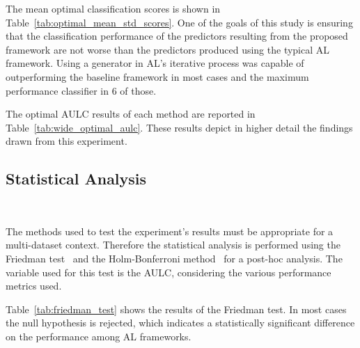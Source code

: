 \documentclass[parskip=full]{scrartcl}
\begin{document}
The mean optimal classification scores is shown in
Table~\ref{tab:optimal_mean_std_scores}. One of the goals of this study is
ensuring that the classification performance of the predictors resulting from
the proposed framework are not worse than the predictors produced using the
typical AL framework. Using a generator in AL's iterative process
was capable of outperforming the baseline framework in most cases and the
maximum performance classifier in 6 of those.


The optimal AULC results of each method are reported in
Table~\ref{tab:wide_optimal_aulc}. These results depict in higher detail the
findings drawn from this experiment.


\subsection{Statistical Analysis}~\label{sec:statistical-analysis}

The methods used to test the experiment's results must be appropriate for a
multi-dataset context. Therefore the statistical analysis is performed using the
Friedman test~\cite{friedman1937use} and the Holm-Bonferroni
method~\cite{holm1979simple} for a post-hoc analysis. The variable used for this
test is the AULC, considering the various performance metrics used.

Table~\ref{tab:friedman_test} shows the results of the Friedman test. In most
cases the null hypothesis is rejected, which indicates a statistically
significant difference on the performance among AL frameworks.
\end{document}
